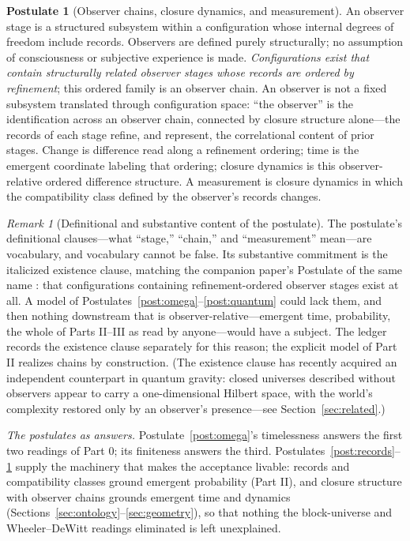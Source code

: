 \documentclass[11pt]{article}
\theoremstyle{definition}
\newtheorem{postulate}{Postulate}
\theoremstyle{remark}
\newtheorem{remark}{Remark}
\begin{document}
\begin{postulate}[Observer chains, closure dynamics, and measurement]\label{post:observers}
An observer stage is a structured subsystem within a configuration whose internal degrees of freedom include records. Observers are defined purely structurally; no assumption of consciousness or subjective experience is made. \emph{Configurations exist that contain structurally related observer stages whose records are ordered by refinement}; this ordered family is an observer chain. An observer is not a fixed subsystem translated through configuration space: ``the observer'' is the identification across an observer chain, connected by closure structure alone---the records of each stage refine, and represent, the correlational content of prior stages. Change is difference read along a refinement ordering; time is the emergent coordinate labeling that ordering; closure dynamics is this observer-relative ordered difference structure. A measurement is closure dynamics in which the compatibility class defined by the observer's records changes.
\end{postulate}

\begin{remark}[Definitional and substantive content of the postulate]\label{rem:obscost}
The postulate's definitional clauses---what ``stage,'' ``chain,'' and ``measurement'' mean---are vocabulary, and vocabulary cannot be false. Its substantive commitment is the italicized existence clause, matching the companion paper's Postulate of the same name \cite{TillittBorn}: that configurations containing refinement-ordered observer stages exist at all. A model of Postulates~\ref{post:omega}--\ref{post:quantum} could lack them, and then nothing downstream that is observer-relative---emergent time, probability, the whole of Parts II--III as read by anyone---would have a subject. The ledger records the existence clause separately for this reason; the explicit model of Part II realizes chains by construction. (The existence clause has recently acquired an independent counterpart in quantum gravity: closed universes described without observers appear to carry a one-dimensional Hilbert space, with the world's complexity restored only by an observer's presence---see Section~\ref{sec:related}.)
\end{remark}

\medskip\noindent\textit{The postulates as answers.} Postulate~\ref{post:omega}'s timelessness answers the first two readings of Part 0; its finiteness answers the third. Postulates~\ref{post:records}--\ref{post:observers} supply the machinery that makes the acceptance livable: records and compatibility classes ground emergent probability (Part II), and closure structure with observer chains grounds emergent time and dynamics (Sections~\ref{sec:ontology}--\ref{sec:geometry}), so that nothing the block-universe and Wheeler--DeWitt readings eliminated is left unexplained.
\end{document}
